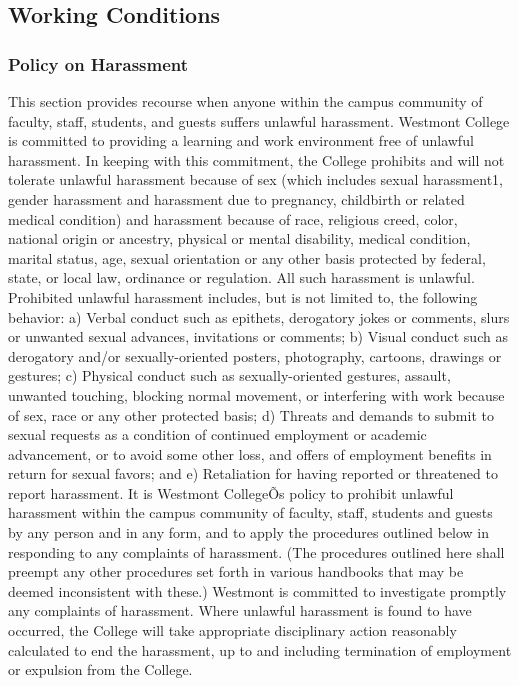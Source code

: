 \documentclass[letterpaper, 11pt]{article}
\begin{document}
	\subsection{Working Conditions}
		\subsubsection{Policy on Harassment}
			This section provides recourse when anyone within the campus community of faculty, staff, students, and guests suffers unlawful harassment.
			Westmont College is committed to providing a learning and work environment free of unlawful harassment.  In keeping with this commitment, the College prohibits and will not tolerate unlawful harassment because of sex (which includes sexual harassment1, gender harassment and harassment due to pregnancy, childbirth or related medical condition) and harassment because of race, religious creed, color, national origin or ancestry, physical or mental disability, medical condition, marital status, age, sexual orientation or any other basis protected by federal, state, or local law, ordinance or regulation.  All such harassment is unlawful.
			Prohibited unlawful harassment includes, but is not limited to, the following behavior:
			a) Verbal conduct such as epithets, derogatory jokes or comments, slurs or unwanted sexual advances, invitations or comments;
			b) Visual conduct such as derogatory and/or sexually-oriented posters, photography, cartoons, drawings or gestures;
			c) Physical conduct such as sexually-oriented gestures, assault, unwanted touching, blocking normal movement, or interfering with work because of sex, race or any other protected basis;
			d) Threats and demands to submit to sexual requests as a condition of continued employment or academic advancement, or to avoid some other loss, and offers of employment benefits in return for sexual favors; and
			e) Retaliation for having reported or threatened to report harassment.
			It is Westmont CollegeÕs policy to prohibit unlawful harassment within the campus community of faculty, staff, students and guests by any person and in any form, and to apply the procedures outlined below in responding to any complaints of harassment.  (The procedures outlined here shall preempt any other procedures set forth in various handbooks that may be deemed inconsistent with these.)  Westmont is committed to investigate promptly any complaints of harassment.  Where unlawful harassment is found to have occurred, the College will take appropriate disciplinary action reasonably calculated to end the harassment, up to and including termination of employment or expulsion from the College.
\end{document}

